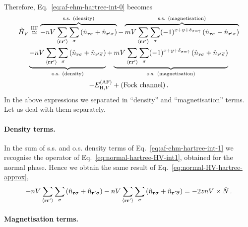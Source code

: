 \begin{tabproof}
\[\begin{aligned}
	\end{aligned}
	\]
	Therefore, Eq.~\eqref{eq:af-ehm-hartree-int-0} becomes
	\begin{multline}
		\hat H_V \HFsimeq \overbrace{
			-nV \sum_{\ev{\mathbf{r}\mathbf{r}'}} \sum_\sigma \left(
			\hat n_{\mathbf{r}\sigma} + \hat n_{\mathbf{r}'\sigma}
			\right)
		}^{\text{s.s. (density)}} - \overbrace{
			mV \sum_{\ev{\mathbf{r}\mathbf{r}'}} \sum_\sigma (-1)^{x+y+\delta_{\sigma=\uparrow}} \left(
			\hat n_{\mathbf{r}\sigma} - \hat n_{\mathbf{r}'\sigma}
			\right)
		}^{\text{s.s. (magnetisation)}} \\
		\underbrace{
			-nV \sum_{\ev{\mathbf{r}\mathbf{r}'}} \sum_\sigma \left(
			\hat n_{\mathbf{r}\sigma} + \hat n_{\mathbf{r}'\overline{\sigma}}
			\right)
		}_{\text{o.s. (density)}} + \underbrace{
			mV \sum_{\ev{\mathbf{r}\mathbf{r}'}} \sum_\sigma (-1)^{x+y+\delta_{\sigma=\uparrow}} \left(
			\hat n_{\mathbf{r}\sigma} + \hat n_{\mathbf{r}'\overline{\sigma}}
			\right)
		}_{\text{o.s. (magnetisation)}} \\
		- E_{\mathrm{H},V}^{(\mathrm{AF})} + (\text{Fock channel}) \, .
		\label{eq:af-ehm-hartree-int-1}
	\end{multline}
	In the above expressions we separated in ``density'' and ``magnetisation'' terms. Let us deal with them separately.
	
	\paragraph{Density terms.}
	
	In the sum of s.s. and o.s. density terms of Eq.~\eqref{eq:af-ehm-hartree-int-1} we recognise the operator of Eq.~\eqref{eq:normal-hartree-HV-int1}, obtained for the normal phase. Hence we obtain the same result of Eq.~\eqref{eq:normal-HV-hartree-approx},
	\begin{equation}\label{eq:af-HV-hartree-approx-density}
		-nV \sum_{\ev{\mathbf{r}\mathbf{r}'}} \sum_\sigma \left(
		\hat n_{\mathbf{r}\sigma} + \hat n_{\mathbf{r}'\sigma}
		\right) -nV \sum_{\ev{\mathbf{r}\mathbf{r}'}} \sum_\sigma \left(
		\hat n_{\mathbf{r}\sigma} + \hat n_{\mathbf{r}'\overline{\sigma}}
		\right) = -2znV \times \hat N \, .
	\end{equation}
	
	\paragraph{Magnetisation terms.}
	

\end{tabproof}
